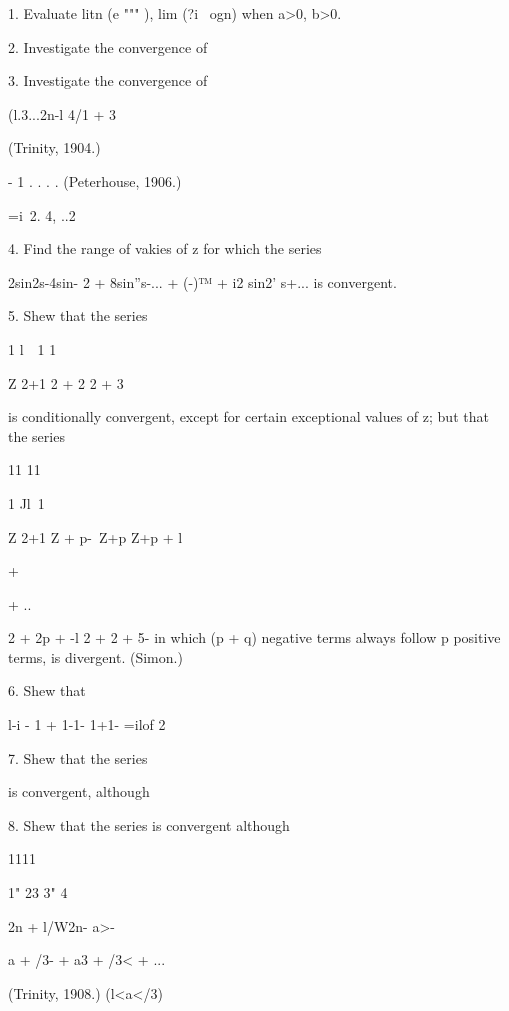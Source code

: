 1. Evaluate litn (e """ ), lim (?i~ ogn) when a>0, b>0.



2. Investigate the convergence of






3. Investigate the convergence of

(l.3...2n-l 4/1 + 3



(Trinity, 1904.)



- 1 . . . . (Peterhouse, 1906.)

 =i\ 2. 4, ..2%

4. Find the range of vakies of z for which the series

2sin2s-4sin- 2 + 8sin''s-... + (-)™ + i2 sin2' s+... is convergent.

5. Shew that the series

1 l\ \ 1 1\

Z 2+1 2 + 2 2 + 3

is conditionally convergent, except for certain exceptional values of
z; but that the series

11 11



1 Jl\ 1

Z 2+1 Z + p-\ Z+p Z+p + l



+



+ ..



2 + 2p + -l 2 + 2 + 5- in which (p + q) negative terms always follow p
positive terms, is divergent. (Simon.)

6. Shew that

l-i - 1 + 1-1- 1+1- =ilof 2

7. Shew that the series



is convergent, although

8. Shew that the series is convergent although



1111

1" 23 3" 4



 2n + l/W2n- a>-

a + /3- + a3 + /3< + ...



(Trinity, 1908.) (l<a</3)




